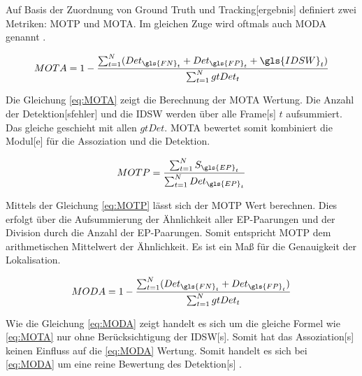 Auf Basis der Zuordnung von \gls{Ground Truth} und \gls{Tracking}[ergebnis] definiert \cite{CLEAR.2008} zwei Metriken: \gls{MOTP} und \gls{MOTA}. Im gleichen Zuge wird oftmals auch \gls{MODA} genannt \cite{Kasturi.2009}. 

\begin{equation}
    \label{eq:MOTA}
    MOTA = 1-\frac{\sum_{t=1}^{N} (Det_{\gls{FN}_{t}}+Det_{\gls{FP}_{t}}+\gls{IDSW}_{t})}{\sum_{t=1}^{N}gtDet_t}
\end{equation}

Die Gleichung \ref{eq:MOTA} zeigt die Berechnung der \gls{MOTA} Wertung. Die Anzahl der \gls{Detektion}[sfehler] und die \gls{IDSW} werden über alle \gls{Frame}[s] \(t\) aufsummiert. Das gleiche geschieht mit allen \(gtDet\). \gls{MOTA} bewertet somit kombiniert die \gls{Modul}[e] für die \gls{Assoziation} und die \gls{Detektion}. 

\begin{equation}
    \label{eq:MOTP}
    MOTP = \frac{\sum_{t=1}^{N}S_{\gls{EP}_t}}{\sum_{t=1}^{N}Det_{\gls{EP}_t}}
\end{equation}

Mittels der Gleichung \ref{eq:MOTP} lässt sich der \gls{MOTP} Wert berechnen. Dies erfolgt über die Aufsummierung der Ähnlichkeit aller \gls{EP}-Paarungen und der Division durch die Anzahl der \gls{EP}-Paarungen. Somit entspricht \gls{MOTP} dem arithmetischen Mittelwert der Ähnlichkeit. Es ist ein Maß für die Genauigkeit der \gls{Lokalisation}.

\begin{equation}
    \label{eq:MODA}
    MODA =  1- \frac{\sum_{t=1}^{N} (Det_{\gls{FN}_{t}}+Det_{\gls{FP}_{t}})}{\sum_{t=1}^{N}gtDet_t}
\end{equation}

Wie die Gleichung \ref{eq:MODA} zeigt handelt es sich um die gleiche Formel wie \ref{eq:MOTA} nur ohne Berücksichtigung der \gls{IDSW}[s]. Somit hat das \gls{Assoziation}[s] keinen Einfluss auf die \ref{eq:MODA} Wertung. Somit handelt es sich bei \ref{eq:MODA} um eine reine Bewertung des \gls{Detektion}[s] \cite{CLEAR.2008, HOTA, Kasturi.2009}.


